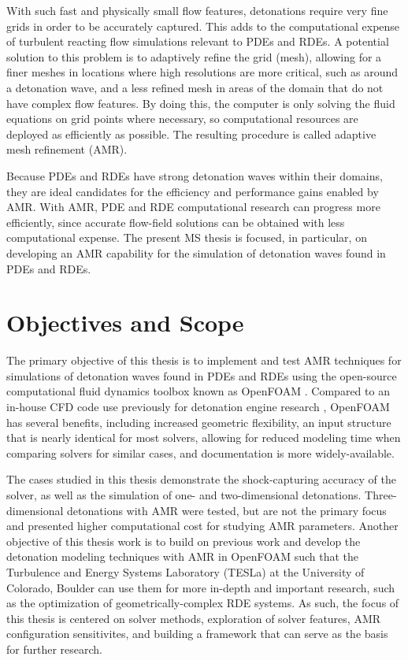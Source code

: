 With such fast and physically small flow features, detonations require very fine grids in order to be accurately captured. This adds to the computational expense of turbulent reacting flow simulations relevant to PDEs and RDEs. A potential solution to this problem is to adaptively refine the grid (mesh), allowing for a finer meshes in locations where high resolutions are more critical, such as around a detonation wave, and a less refined mesh in areas of the domain that do not have complex flow features. By doing this, the computer is only solving the fluid equations on grid points where necessary, so computational resources are deployed as efficiently as possible. The resulting procedure is called adaptive mesh refinement (AMR). 

Because PDEs and RDEs have strong detonation waves within their domains, they are ideal candidates for the efficiency and performance gains enabled by AMR. With AMR, PDE and RDE computational research can progress more efficiently, since accurate flow-field solutions can be obtained with less computational expense. The present MS thesis is focused, in particular, on developing an AMR capability for the simulation of detonation waves found in PDEs and RDEs.

\section{Objectives and Scope}
The primary objective of this thesis is to implement and test AMR techniques for simulations of detonation waves found in PDEs and RDEs using the open-source computational fluid dynamics toolbox known as OpenFOAM \cite{weller}. Compared to an in-house CFD code use previously for detonation engine research \cite{towery1}, OpenFOAM has several benefits, including increased geometric flexibility, an input structure that is nearly identical for most solvers, allowing for reduced modeling time when comparing solvers for similar cases, and documentation is more widely-available.

The cases studied in this thesis demonstrate the shock-capturing accuracy of the solver, as well as the simulation of one- and two-dimensional detonations. Three-dimensional detonations with AMR were tested, but are not the primary focus and presented higher computational cost for studying AMR parameters. Another objective of this thesis work is to build on previous work \cite{towery1} and develop the detonation modeling techniques with AMR in OpenFOAM such that the Turbulence and Energy Systems Laboratory (TESLa) at the University of Colorado, Boulder can use them for more in-depth and important research, such as the optimization of geometrically-complex RDE systems. As such, the focus of this thesis is centered on solver methods, exploration of solver features, AMR configuration sensitivites, and building a framework that can serve as the basis for further research. 

